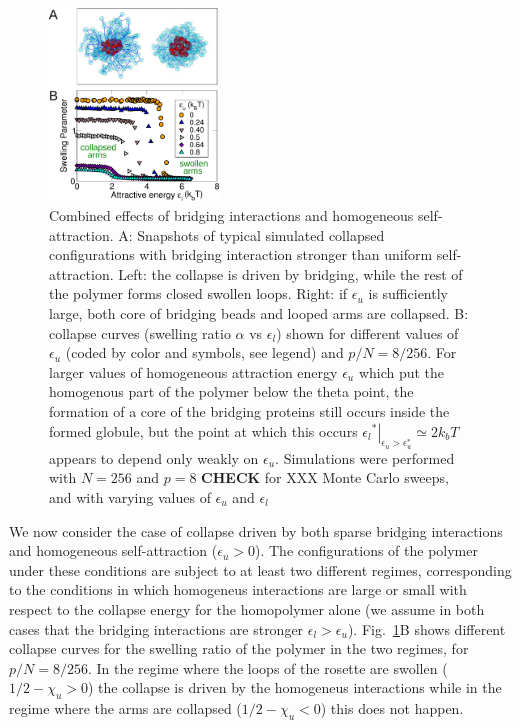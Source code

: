 \documentclass[
preprint,
a4paper,
12pt,
superscriptaddress,
pre]{revtex4}
\begin{document}
\begin{figure}
  \centering
  \includegraphics[width=0.4\textwidth]{fig4}
  \caption{Combined effects of bridging interactions and
      homogeneous self-attraction.  A: Snapshots of  typical simulated
      collapsed configurations with bridging interaction stronger than
      uniform self-attraction. Left: the collapse is driven
      by bridging,  while the rest of the polymer forms closed swollen
      loops. Right: if $\epsilon_u$ is sufficiently large, both core
      of bridging beads and looped arms are collapsed. 
    B: collapse curves (swelling ratio $\alpha$ vs $\epsilon_l$) shown for
    different values of $\epsilon_u$ (coded by color and symbols, see
    legend) and $p/N = 8/256$.
%
    For larger values of homogeneous attraction energy $\epsilon_u$
    which put the homogenous part of the polymer below the theta
    point, the formation of a core  of the bridging proteins still occurs inside
    the formed globule, but the point at which this  occurs
    $\left.{\epsilon_l}^*\right|_{\epsilon_u > \epsilon_u^*} \simeq 2k_bT$
    appears to depend only weakly on $\epsilon_u$.
%
    Simulations were  performed with $N=256$ and $p=8$
    \textbf{CHECK} for XXX Monte Carlo sweeps, and with varying values
    of $\epsilon_u$ and $\epsilon_l$ }
  \label{fig:4}
\end{figure}

We now consider the case of collapse driven by both sparse bridging
interactions and homogeneous self-attraction ($\epsilon_u > 0$).  The
configurations of the polymer under these conditions are subject to at
least two different regimes, corresponding to the conditions in which
homogeneus interactions are large or small with respect to the
collapse energy for the homopolymer alone (we assume in both cases
that the bridging interactions are stronger $\epsilon_l >
\epsilon_u$).
Fig.~\ref{fig:4}B shows different collapse curves for the swelling
ratio of the polymer in the two regimes, for $p/N = 8/256$. In the
regime where the loops of the rosette are swollen ($1/2 - \chi_u > 0$)
the collapse is driven by the homogeneus interactions while in the
regime where the arms are collapsed ($1/2 - \chi_u < 0$) this does not
happen. 
%
\end{document}
